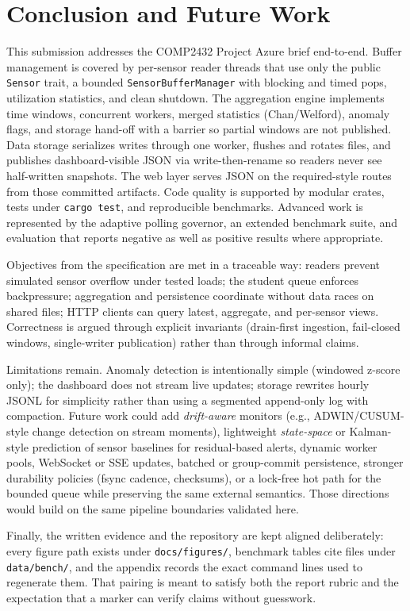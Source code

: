 \documentclass[11pt]{article}
\begin{document}
\section{Conclusion and Future Work}
This submission addresses the COMP2432 Project Azure brief end-to-end. Buffer management is covered by per-sensor reader threads that use only the public \texttt{Sensor} trait, a bounded \texttt{SensorBufferManager} with blocking and timed pops, utilization statistics, and clean shutdown. The aggregation engine implements time windows, concurrent workers, merged statistics (Chan/Welford), anomaly flags, and storage hand-off with a barrier so partial windows are not published. Data storage serializes writes through one worker, flushes and rotates files, and publishes dashboard-visible JSON via write-then-rename so readers never see half-written snapshots. The web layer serves JSON on the required-style routes from those committed artifacts. Code quality is supported by modular crates, tests under \texttt{cargo test}, and reproducible benchmarks. Advanced work is represented by the adaptive polling governor, an extended benchmark suite, and evaluation that reports negative as well as positive results where appropriate.

Objectives from the specification are met in a traceable way: readers prevent simulated sensor overflow under tested loads; the student queue enforces backpressure; aggregation and persistence coordinate without data races on shared files; HTTP clients can query latest, aggregate, and per-sensor views. Correctness is argued through explicit invariants (drain-first ingestion, fail-closed windows, single-writer publication) rather than through informal claims.

Limitations remain. Anomaly detection is intentionally simple (windowed z-score only); the dashboard does not stream live updates; storage rewrites hourly JSONL for simplicity rather than using a segmented append-only log with compaction. Future work could add \emph{drift-aware} monitors (e.g., ADWIN/CUSUM-style change detection on stream moments), lightweight \emph{state-space} or Kalman-style prediction of sensor baselines for residual-based alerts, dynamic worker pools, WebSocket or SSE updates, batched or group-commit persistence, stronger durability policies (fsync cadence, checksums), or a lock-free hot path for the bounded queue while preserving the same external semantics. Those directions would build on the same pipeline boundaries validated here.

Finally, the written evidence and the repository are kept aligned deliberately: every figure path exists under \texttt{docs/figures/}, benchmark tables cite files under \texttt{data/bench/}, and the appendix records the exact command lines used to regenerate them. That pairing is meant to satisfy both the report rubric and the expectation that a marker can verify claims without guesswork.
\end{document}
